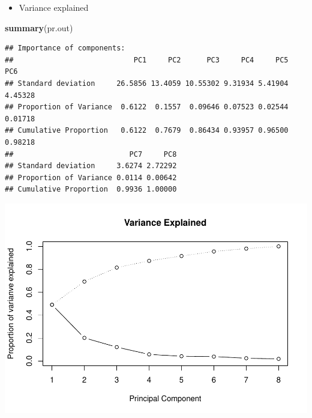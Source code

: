 \documentclass[]{article}
\newenvironment{Shaded}{\begin{snugshade}}{\end{snugshade}}
\newcommand{\KeywordTok}[1]{\textcolor[rgb]{0.13,0.29,0.53}{\textbf{#1}}}
\newcommand{\DataTypeTok}[1]{\textcolor[rgb]{0.13,0.29,0.53}{#1}}
\newcommand{\DecValTok}[1]{\textcolor[rgb]{0.00,0.00,0.81}{#1}}
\newcommand{\StringTok}[1]{\textcolor[rgb]{0.31,0.60,0.02}{#1}}
\newcommand{\CommentTok}[1]{\textcolor[rgb]{0.56,0.35,0.01}{\textit{#1}}}
\newcommand{\OperatorTok}[1]{\textcolor[rgb]{0.81,0.36,0.00}{\textbf{#1}}}
\newcommand{\NormalTok}[1]{#1}
\providecommand{\tightlist}{%
  \setlength{\itemsep}{0pt}\setlength{\parskip}{0pt}}
\begin{document}
\begin{itemize}
\tightlist
\item
  Variance explained
\end{itemize}

\begin{Shaded}
\begin{Highlighting}[]
\KeywordTok{summary}\NormalTok{(pr.out)}
\end{Highlighting}
\end{Shaded}

\begin{verbatim}
## Importance of components:
##                            PC1     PC2      PC3     PC4     PC5     PC6
## Standard deviation     26.5856 13.4059 10.55302 9.31934 5.41904 4.45328
## Proportion of Variance  0.6122  0.1557  0.09646 0.07523 0.02544 0.01718
## Cumulative Proportion   0.6122  0.7679  0.86434 0.93957 0.96500 0.98218
##                           PC7     PC8
## Standard deviation     3.6274 2.72292
## Proportion of Variance 0.0114 0.00642
## Cumulative Proportion  0.9936 1.00000
\end{verbatim}

\begin{Shaded}
\end{Shaded}

\includegraphics{assignment1_PCA_files/figure-latex/unnamed-chunk-9-1.pdf}
\end{document}
